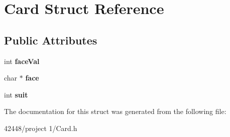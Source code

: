 \hypertarget{struct_card}{\section{Card Struct Reference}
\label{struct_card}
}
\subsection*{Public Attributes}
\begin{DoxyCompactItemize}
\item 
\hypertarget{struct_card_ad06290a3e40429688370e411c9f60ce0}{int {\bfseries face\-Val}}\label{struct_card_ad06290a3e40429688370e411c9f60ce0}

\item 
\hypertarget{struct_card_a7ae3d823b8d58c9935f58aeb618bc07a}{char $\ast$ {\bfseries face}}\label{struct_card_a7ae3d823b8d58c9935f58aeb618bc07a}

\item 
\hypertarget{struct_card_a68d1b935f3e4830af01fb9dba6c8220a}{int {\bfseries suit}}\label{struct_card_a68d1b935f3e4830af01fb9dba6c8220a}

\end{DoxyCompactItemize}


The documentation for this struct was generated from the following file\-:\begin{DoxyCompactItemize}
\item 
42448/project 1/Card.\-h\end{DoxyCompactItemize}
